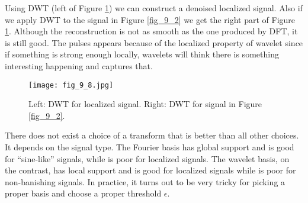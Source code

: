 \documentclass[../main.tex]{subfiles}
\begin{document}
Using DWT (left of Figure \ref{fig_9_8}) we can construct a denoised localized signal. Also if we apply DWT to the signal in Figure \ref{fig_9_2} we get the right part of Figure \ref{fig_9_8}. Although the reconstruction is not as smooth as the one produced by DFT, it is still good. The pulses appears because of the localized property of wavelet since if something is strong enough locally, wavelets will think there is something interesting happening and captures that. 
\begin{figure}[h] 
	\centering 
	\texttt{[image: fig\_9\_8.jpg]} 
	\caption{Left: DWT for localized signal. Right: DWT for signal in Figure \ref{fig_9_2}.}\label{fig_9_8}
\end{figure}
\par There does not exist a choice of a transform that is better than all other choices. It depends on the signal type. The Fourier basis has global support and is good for ``sine-like'' signals, while is poor for localized signals. The wavelet basis, on the contrast, has local support and is good for localized signals while is poor for non-banishing signals. In practice, it turns out to be very tricky for picking a proper basis and choose a proper threshold $\epsilon$. 
\end{document}
